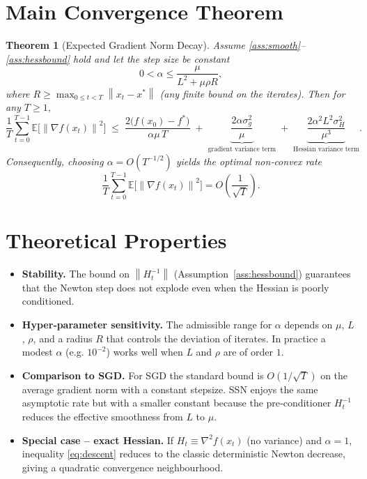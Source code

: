 \documentclass{article}
\newtheorem{theorem}{Theorem}
\newcommand{\E}{\mathbb{E}}
\newcommand{\norm}[1]{\left\|#1\right\|}
\newcommand{\grad}{\nabla}
\newcommand{\hess}{\nabla^{2}}
\begin{document}
\section*{Main Convergence Theorem}
\begin{theorem}[Expected Gradient Norm Decay]\label{thm:main}
Assume \ref{ass:smooth}–\ref{ass:hessbound} hold and let the step size be constant
\[
0<\alpha\le\frac{\mu}{L^{2}+ \mu\rho R},
\]
where $R\ge\max_{0\le t<T}\norm{x_{t}-x^{*}}$ (any finite bound on the iterates). Then for any $T\ge1$,
\[
\frac{1}{T}\sum_{t=0}^{T-1}\E\!\big[\norm{\grad f(x_{t})}^{2}\big]
\;\le\;
\frac{2\big(f(x_{0})-f^{*}\big)}{\alpha\mu\,T}
\;+\;
\underbrace{\frac{2\alpha\sigma_{g}^{2}}{\mu}}_{\text{gradient variance term}}
\;+\;
\underbrace{\frac{2\alpha^{2}L^{2}\sigma_{H}^{2}}{\mu^{3}}}_{\text{Hessian variance term}} .
\]
Consequently, choosing $\alpha=O(T^{-1/2})$ yields the optimal non‑convex rate
\[
\frac{1}{T}\sum_{t=0}^{T-1}\E\!\big[\norm{\grad f(x_{t})}^{2}\big]=O\!\left(\frac{1}{\sqrt{T}}\right).
\]
\end{theorem}

\section*{Theoretical Properties}
\begin{itemize}
\item \textbf{Stability.} The bound on $\norm{H_{t}^{-1}}$ (Assumption~\ref{ass:hessbound}) guarantees that the Newton step does not explode even when the Hessian is poorly conditioned.
\item \textbf{Hyper‑parameter sensitivity.} The admissible range for $\alpha$ depends on $\mu$, $L$, $\rho$, and a radius $R$ that controls the deviation of iterates. In practice a modest $\alpha$ (e.g. $10^{-2}$) works well when $L$ and $\rho$ are of order $1$.
\item \textbf{Comparison to SGD.} For SGD the standard bound is $O(1/\sqrt{T})$ on the average gradient norm with a constant stepsize. SSN enjoys the same asymptotic rate but with a smaller constant because the pre‑conditioner $H_{t}^{-1}$ reduces the effective smoothness from $L$ to $\mu$.
\item \textbf{Special case – exact Hessian.} If $H_{t}\equiv\hess f(x_{t})$ (no variance) and $\alpha=1$, inequality \eqref{eq:descent} reduces to the classic deterministic Newton decrease, giving a quadratic convergence neighbourhood.
\end{itemize}
\end{document}
